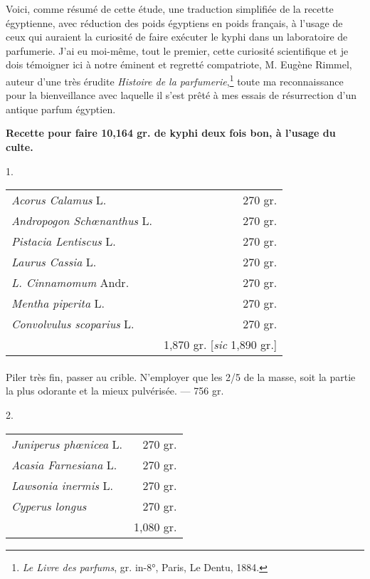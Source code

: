 \documentclass[a4paper, 11pt, oneside]{article}
\begin{document}
Voici, comme résumé de cette étude, une traduction simplifiée de la recette égyptienne, avec réduction des poids égyptiens en poids français, à l'usage de ceux qui auraient la curiosité de faire exécuter le kyphi dans un laboratoire de parfumerie. J'ai eu moi-même, tout le premier, cette curiosité scientifique et je dois témoigner ici à notre éminent et regretté compatriote, M. Eugène Rimmel, auteur d'une très érudite \emph{Histoire de la parfumerie},\footnote{\emph{Le Livre des parfums}, gr. in-8°, Paris, Le Dentu, 1884.} toute ma reconnaissance pour la bienveillance avec laquelle il s'est prêté à mes essais de résurrection d'un antique parfum égyptien.

\begin{center}
\textbf{Recette pour faire 10,164 gr. de kyphi deux fois bon, à l'usage du culte.}
\end{center}
\begin{center}
1.
\end{center}
\begin{table}[H]
    \centering
    \begin{tabular}{l r}
        \emph{Acorus Calamus} L.  &  270 gr. \\
        \emph{Andropogon Schœnanthus} L.  &  270 gr. \\
        \emph{Pistacia Lentiscus} L.  &  270 gr. \\
        \emph{Laurus Cassia} L.  &  270 gr. \\
        \emph{L. Cinnamomum} Andr.  &  270 gr. \\
        \emph{Mentha piperita} L.  &  270 gr. \\
        \emph{Convolvulus scoparius} L.  &  270 gr. \\ \hline
        ~ & 1,870 gr. [\emph{sic} 1,890 gr.] \\
    \end{tabular}
\end{table}
\paragraph{}
Piler très fin, passer au crible. N'employer que les 2/5 de la masse, soit la partie la plus odorante et la mieux pulvérisée. --- 756 gr.
\begin{center}
2.
\end{center}
\begin{table}[H]
    \centering
    \begin{tabular}{l r}
        \emph{Juniperus phœnicea} L.  &  270 gr. \\
        \emph{Acasia Farnesiana} L.  &  270 gr. \\
        \emph{Lawsonia inermis} L.  &  270 gr. \\
        \emph{Cyperus longus}  &  270 gr. \\ \hline
        ~ & 1,080 gr. \\
    \end{tabular}
\end{table}
\end{document}

